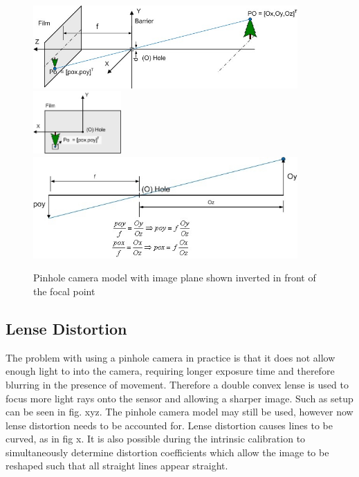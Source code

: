 \begin{figure}[h!]
  \centering
    \includegraphics[width=0.9\textwidth]{chapters/images/cam_model_fig41} \\
    \includegraphics[width=0.3\textwidth]{chapters/images/cam_model_fig42} \\
    \includegraphics[width=0.9\textwidth]{chapters/images/cam_model_fig43} 
  \caption{Pinhole camera model with image plane shown inverted in front of the focal point}
\end{figure}


\subsection{Lense Distortion}

The problem with using a pinhole camera in practice is that it does not allow enough light to into
the camera, requiring longer exposure time and therefore blurring in the presence of movement. 
Therefore a double convex lense is used to focus more light rays onto the sensor and allowing a
sharper image.  Such as setup can be seen in fig. xyz.  The pinhole camera model may still be used,
however now lense distortion needs to be accounted for.  Lense distortion causes lines to be
curved, as in fig x.  It is also possible during the intrinsic calibration to simultaneously
determine distortion coefficients which allow the image to be reshaped such that all straight lines
appear straight.

